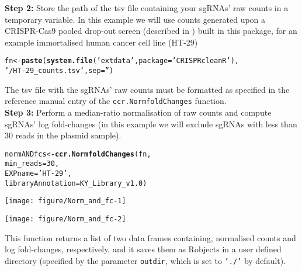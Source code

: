 \documentclass{article}\usepackage[]{graphicx}\usepackage[]{color}
\makeatletter
\def\maxwidth{ %
  \ifdim\Gin@nat@width>\linewidth
    \linewidth
  \else
    \Gin@nat@width
  \fi
}
\newcommand{\hlnum}[1]{\textcolor[rgb]{0.686,0.059,0.569}{#1}}%
\newcommand{\hlstr}[1]{\textcolor[rgb]{0.192,0.494,0.8}{#1}}%
\newcommand{\hlstd}[1]{\textcolor[rgb]{0.345,0.345,0.345}{#1}}%
\newcommand{\hlkwb}[1]{\textcolor[rgb]{0.69,0.353,0.396}{#1}}%
\newcommand{\hlkwc}[1]{\textcolor[rgb]{0.333,0.667,0.333}{#1}}%
\newcommand{\hlkwd}[1]{\textcolor[rgb]{0.737,0.353,0.396}{\textbf{#1}}}%
\newenvironment{kframe}{%
 \def\at@end@of@kframe{}%
 \ifinner\ifhmode%
  \def\at@end@of@kframe{\end{minipage}}%
  \begin{minipage}{\columnwidth}%
 \fi\fi%
 \def\FrameCommand##1{\hskip\@totalleftmargin \hskip-\fboxsep
 \colorbox{shadecolor}{##1}\hskip-\fboxsep
     \hskip-\linewidth \hskip-\@totalleftmargin \hskip\columnwidth}%
 \MakeFramed {\advance\hsize-\width
   \@totalleftmargin\z@ \linewidth\hsize
   \@setminipage}}%
 {\par\unskip\endMakeFramed%
 \at@end@of@kframe}
\newenvironment{knitrout}{}{} %
\makeatother
\begin{document}
\textbf{Step 2:} Store the path of the tsv file containing your sgRNAs' raw counts in a temporary variable. In this example we will use counts generated upon a CRISPR-Cas9 pooled drop-out screen (described in \cite{Iorio:2017}) built in this package, for an example immortalised human cancer cell line (HT-29)

\begin{knitrout}
\color{fgcolor}\begin{kframe}
\begin{alltt}
 \hlstd{fn}\hlkwb{<-}\hlkwd{paste}\hlstd{(}\hlkwd{system.file}\hlstd{(}\hlstr{'extdata'}\hlstd{,}\hlkwc{package} \hlstd{=} \hlstr{'CRISPRcleanR'}\hlstd{),}
           \hlstr{'/HT-29_counts.tsv'}\hlstd{,}\hlkwc{sep}\hlstd{=}\hlstr{''}\hlstd{)}
\end{alltt}
\end{kframe}
\end{knitrout}

The tsv file with the sgRNAs' raw counts must be formatted as specified in the reference manual entry of the \texttt{ccr.NormfoldChanges} function.\\
 
\textbf{Step 3:} Perform a median-ratio normalisation of raw counts and compute sgRNAs' log fold-changes (in this example we will exclude sgRNAs with less than 30 reads in the plasmid sample).

\begin{knitrout}
\color{fgcolor}\begin{kframe}
\begin{alltt}
\hlstd{normANDfcs}\hlkwb{<-}\hlkwd{ccr.NormfoldChanges}\hlstd{(fn,}
                                 \hlkwc{min_reads}\hlstd{=}\hlnum{30}\hlstd{,}
                                 \hlkwc{EXPname}\hlstd{=}\hlstr{'HT-29'}\hlstd{,}
                                 \hlkwc{libraryAnnotation}\hlstd{=KY_Library_v1.0)}
\end{alltt}
\end{kframe}
\texttt{[image: figure/Norm\_and\_fc-1]} 

\texttt{[image: figure/Norm\_and\_fc-2]} 

\end{knitrout}

This function returns a list of two data frames containing, normalised counts and log fold-changes, respectively, and it saves them as Robjects in a user defined directory (specified by the parameter \texttt{outdir}, which is set to \texttt{'./'} by default).
\end{document}
